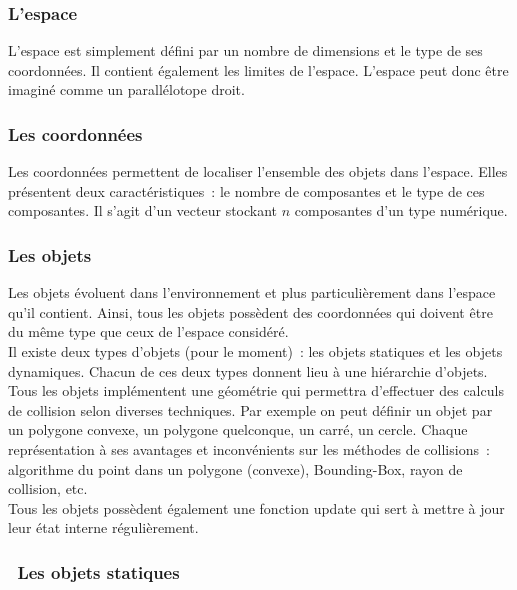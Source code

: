 \subsubsection*{L'espace}

L'espace est simplement défini par un nombre de dimensions et le type de ses coordonnées.
Il contient également les limites de l'espace. L'espace peut donc être imaginé comme un parallélotope droit.

\subsubsection*{Les coordonnées}

Les coordonnées permettent de localiser l'ensemble des objets dans l'espace. Elles présentent deux caractéristiques~: le nombre de composantes et le type de ces composantes. Il s'agit d'un vecteur stockant $n$ composantes d'un type numérique.

\subsubsection*{Les objets}

Les objets évoluent dans l'environnement et plus particulièrement dans l'espace qu'il contient. Ainsi, tous les objets possèdent des coordonnées qui doivent être du même type que ceux de l'espace considéré.\\
\indent Il existe deux types d'objets (pour le moment)~: les objets statiques et les objets dynamiques. Chacun de ces deux types donnent lieu à une hiérarchie d'objets.\\

Tous les objets implémentent une géométrie qui permettra d'effectuer des calculs de collision selon diverses techniques. Par exemple on peut définir un objet par un polygone convexe, un polygone quelconque, un carré, un cercle. Chaque représentation à ses avantages et inconvénients sur les méthodes de collisions~: algorithme du point dans un polygone (convexe), Bounding-Box, rayon de collision, etc.\\

Tous les objets possèdent également une fonction update qui sert à mettre à jour leur état interne régulièrement.

\subsubsection*{\textbullet ~Les objets statiques}

